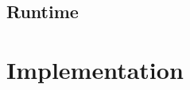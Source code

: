 \documentclass[11pt]{article}
\newcommand{\lang}{\$LANG}
\begin{document}
\subsection{Runtime}


\section{Implementation}







\begin{comment}

\section{Description of implementation and choices}

\subsection{A subset language as a Haskell DSL}
This will 

\subsection{Syntax}
One of the earlier considerations for this project, by virtue of the natural order
of implementing features in \lang, was the syntax of the developer facing input 
language (the "language" itself really). I knew from the outset that the syntax
used in javascript was not something I wished to reinvent, seeing it more as a
problem than an inspiration. 

The syntax in javascript feels like a relic of a different time. It is a common
problem brought up by programmers new to the language, and an accepted
hindrance for anyone more experience with javascript. 

Keywords such as 'new', 'var', and 'function' serve as examples of ideas on syntax
design which have become far less common since javascript was created. 'var', for
instance, adds verbosity to the language while providing little benefit. Seemingly
inspired by Scheme's 'define' concept, it adds additional cruft to declaration 
statements which are otherwise self-explanatory in languages with more minimal 
syntaxes such as Python. A declaration can be inferred sufficiently from a simple
"x = y" statement and its context. 'function' as a keyword also seems to have been
inspired by Scheme, in this case its liberal use of the 'lambda' keyword to represent
anonymous functions. Languages such as Haskell dont overcomplicate their function
defintions, content with statements as simple and declarative as 'f x y = x + y',
as well as internally scoped (fix that terminology when less tired) functions using
the where keyword etc.
Type signatures are optional but do serve to make the code in question more readable and
solve some programmer headaches (from a syntactical point of view, they obviously have other 
significant semantic effects). 


\end{comment}
\end{document}
